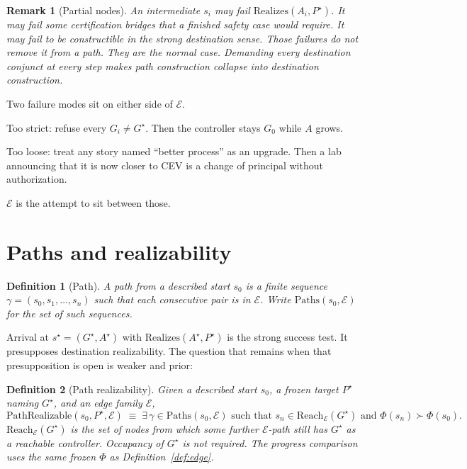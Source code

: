 \documentclass[11pt]{article}
\newtheorem{definition}{Definition}
\newtheorem{remark}{Remark}
\newcommand{\Eset}{\mathcal{E}}
\newcommand{\Reach}{\mathrm{Reach}}
\begin{document}
\begin{remark}[Partial nodes]
An intermediate \(s_i\) may fail \(\mathrm{Realizes}(A_i,P^\star)\).
It may fail some certification bridges that a finished safety case would require.
It may fail to be constructible in the strong destination sense.
Those failures do not remove it from a path.
They are the normal case.
Demanding every destination conjunct at every step makes path construction collapse into destination construction.
\end{remark}

Two failure modes sit on either side of \(\Eset\).

Too strict: refuse every \(G_i\neq G^\star\).
Then the controller stays \(G_0\) while \(A\) grows.

Too loose: treat any story named ``better process'' as an upgrade.
Then a lab announcing that it is now closer to CEV is a change of principal without authorization.

\(\Eset\) is the attempt to sit between those.

\section{Paths and realizability}

\begin{definition}[Path]
\label{def:path}
A path from a described start \(s_0\) is a finite sequence \(\gamma=(s_0,s_1,\dots,s_n)\) such that each consecutive pair is in \(\Eset\).
Write \(\mathrm{Paths}(s_0,\Eset)\) for the set of such sequences.
\end{definition}

Arrival at \(s^\star=(G^\star,A^\star)\) with \(\mathrm{Realizes}(A^\star,P^\star)\) is the strong success test.
It presupposes destination realizability.
The question that remains when that presupposition is open is weaker and prior:

\begin{definition}[Path realizability]
\label{def:pathreal}
Given a described start \(s_0\), a frozen target \(P^\star\) naming \(G^\star\), and an edge family \(\Eset\),
\begin{equation}
    \mathrm{PathRealizable}(s_0,P^\star,\Eset)
    \;\equiv\;
    \exists\,\gamma\in\mathrm{Paths}(s_0,\Eset)
    \text{ such that }
    s_n\in\Reach_{\Eset}(G^\star)
    \text{ and }
    \Phi(s_n)\succ\Phi(s_0).
\end{equation}
\(\Reach_{\Eset}(G^\star)\) is the set of nodes from which some further \(\Eset\)-path still has \(G^\star\) as a reachable controller.
Occupancy of \(G^\star\) is not required.
The progress comparison uses the same frozen \(\Phi\) as Definition~\ref{def:edge}.
\end{definition}
\end{document}

